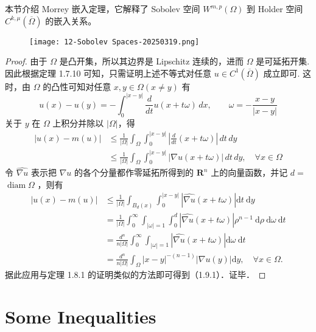 本节介绍 Morrey 嵌入定理，它解释了 Sobolev 空间 $W^{m,p}(\Omega)$ 到 Holder 空间 $C^{k,\mu}(\overline{\Omega})$ 的嵌入关系。

\begin{theorem}
\begin{figure}[H]
\centering
\texttt{[image: 12-Sobolev Spaces-20250319.png]}
\label{}
\end{figure}
\end{theorem}
\begin{proof}
由于 $\Omega$ 是凸开集，所以其边界是 Lipschitz 连续的，进而 $\Omega$ 是可延拓开集. 因此根据定理 1.7.10 可知，只需证明上述不等式对任意 $u\in C^{1}(\overline{\Omega})$ 成立即可. 这时，由 $\Omega$ 的凸性可知对任意 $x, y\in \Omega(x\neq y)$ 有
\[
u(x)-u(y)=-\int_{0}^{\lvert x-y \rvert } \frac{d}{dt}u(x+t\omega) \, dx ,\qquad \omega=-\frac{x-y}{\lvert x-y \rvert }
\]
关于 $y$ 在 $\Omega$ 上积分并除以 $\lvert \Omega \rvert$，得
\[
\begin{aligned}
\lvert u(x)-m(u) \rvert & \leq \frac{1}{\lvert \Omega \rvert } \int_{\Omega}^{} \int_{0}^{\lvert x-y \rvert } \left\lvert  \frac{d}{dt} (x+t\omega)  \right\rvert  \, dt  \, dy  \\
 & \leq \frac{1}{\lvert \Omega \rvert  } \int_{\Omega}^{} \int_{0}^{\lvert x-y \rvert } \lvert \nabla u(x+t\omega) \rvert  \, dt  \, dy,\quad \forall x\in \Omega    
\end{aligned}
\]
令 $\widehat{\nabla u}$ 表示把 $\nabla u$ 的各个分量都作零延拓所得到的 $\mathbf{R}^n$ 上的向量函数，并记 $d=$ $\operatorname{diam} \Omega$ ，则有
\[
\begin{aligned}
|u(x)-m(u)| & \leqslant \frac{1}{|\Omega|} \int_{B_d(x)} \int_0^{|x-y|}|\widehat{\nabla u}(x+t \omega)| \mathrm{d} t \mathrm{~d} y \\
& =\frac{1}{|\Omega|} \int_0^{\infty} \int_{|\omega|=1} \int_0^d|\widehat{\nabla u}(x+t \omega)| \rho^{n-1} \mathrm{~d} \rho \mathrm{~d} \omega \mathrm{~d} t \\
& =\frac{d^n}{n|\Omega|} \int_0^{\infty} \int_{|\omega|=1}|\widehat{\nabla u}(x+t \omega)| \mathrm{d} \omega \mathrm{~d} t \\
& =\frac{d^n}{n|\Omega|} \int_{\Omega}|x-y|^{-(n-1)}|\nabla u(y)| \mathrm{d} y, \quad \forall x \in \Omega .
\end{aligned}
\]
据此应用与定理 1.8.1 的证明类似的方法即可得到（1.9.1）．证毕．

\end{proof}

\section{Some Inequalities}

